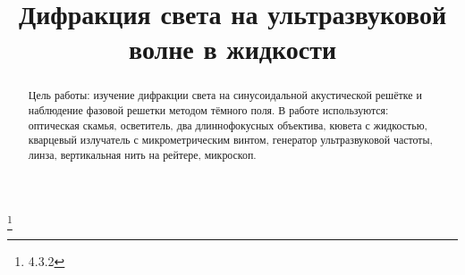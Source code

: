 


\title{Дифракция света на ультразвуковой волне в жидкости}
\thanks{4.3.2}



\begin{abstract}
Цель работы: изучение дифракции света на синусоидальной акустической решётке и наблюдение фазовой решетки методом тёмного поля.
В работе используются: оптическая скамья, осветитель, два длиннофокусных объектива, кювета с жидкостью, кварцевый излучатель с микрометрическим винтом, генератор ультразвуковой частоты, линза, вертикальная нить на рейтере, микроскоп.

\end{abstract}


\maketitle

